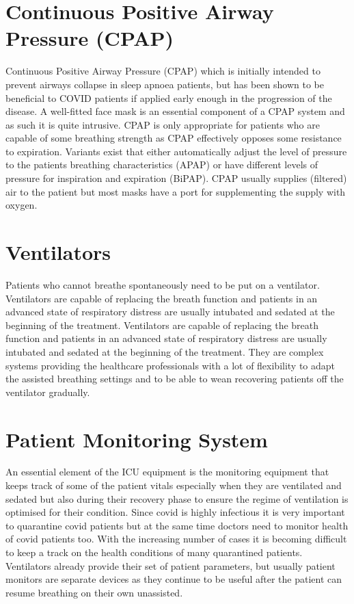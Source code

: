 \documentclass[12pt]{article}
\begin{document}
\section{Continuous Positive Airway Pressure (CPAP)}
Continuous Positive Airway Pressure (CPAP) which is initially intended to prevent airways collapse in sleep apnoea patients, but has been shown to be beneficial to COVID patients if applied early enough in the progression of the disease.\newline
A well-fitted face mask is an essential component of a CPAP system and as such it is quite intrusive. CPAP is only appropriate for patients who are capable of some breathing strength as CPAP effectively opposes some resistance to expiration. Variants exist that either automatically adjust the level of pressure to the patients breathing characteristics (APAP) or have different levels of pressure for inspiration and expiration (BiPAP). CPAP usually supplies (filtered) air to the patient but most masks have a port for supplementing the supply with oxygen.


\section{Ventilators}
Patients who cannot breathe spontaneously need to be put on a ventilator. Ventilators are capable of replacing the breath function and patients in an advanced state of respiratory distress are usually intubated and sedated at the beginning of the treatment.\newline
Ventilators are capable of replacing the breath function and patients in an advanced state of respiratory distress are usually intubated and sedated at the beginning of the treatment. They are complex systems providing the healthcare professionals with a lot of flexibility to adapt the assisted breathing settings and to be able to wean recovering patients off the ventilator gradually.

 \section{Patient Monitoring System}
An essential element of the ICU equipment is the monitoring equipment that keeps track of some of the patient vitals especially when they are ventilated and sedated but also during their recovery phase to ensure the regime of ventilation is optimised for their condition. \newline
Since covid is highly infectious it is very important to quarantine covid patients but at the same time doctors need to monitor health of covid patients too. With the increasing number of cases it is becoming difficult to keep a track on the health conditions of many quarantined patients. Ventilators already provide their set of patient parameters, but usually patient monitors are separate devices as they continue to be useful after the patient can resume breathing on their own unassisted.
\end{document}
